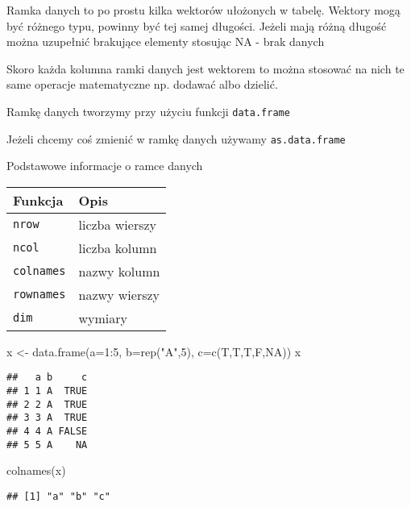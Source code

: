\documentclass[
]{book}
\newenvironment{Shaded}{\begin{snugshade}}{\end{snugshade}}
\newcommand{\AttributeTok}[1]{\textcolor[rgb]{0.77,0.63,0.00}{#1}}
\newcommand{\ConstantTok}[1]{\textcolor[rgb]{0.00,0.00,0.00}{#1}}
\newcommand{\DecValTok}[1]{\textcolor[rgb]{0.00,0.00,0.81}{#1}}
\newcommand{\FunctionTok}[1]{\textcolor[rgb]{0.00,0.00,0.00}{#1}}
\newcommand{\NormalTok}[1]{#1}
\newcommand{\OtherTok}[1]{\textcolor[rgb]{0.56,0.35,0.01}{#1}}
\newcommand{\SpecialCharTok}[1]{\textcolor[rgb]{0.00,0.00,0.00}{#1}}
\newcommand{\StringTok}[1]{\textcolor[rgb]{0.31,0.60,0.02}{#1}}
\begin{document}
Ramka danych to po prostu kilka wektorów ułożonych w tabelę. Wektory mogą być różnego typu, powinny być tej samej długości. Jeżeli mają różną długość można uzupełnić brakujące elementy stosując NA - brak danych

Skoro każda kolumna ramki danych jest wektorem to można stosować na nich te same operacje matematyczne np. dodawać albo dzielić.

Ramkę danych tworzymy przy użyciu funkcji \texttt{data.frame}

Jeżeli chcemy coś zmienić w ramkę danych używamy \texttt{as.data.frame}

Podstawowe informacje o ramce danych

\begin{longtable}[]{@{}ll@{}}
\toprule
Funkcja & Opis \\
\midrule
\endhead
\texttt{nrow} & liczba wierszy \\
\texttt{ncol} & liczba kolumn \\
\texttt{colnames} & nazwy kolumn \\
\texttt{rownames} & nazwy wierszy \\
\texttt{dim} & wymiary \\
\bottomrule
\end{longtable}

\begin{Shaded}
\begin{Highlighting}[]
\NormalTok{x }\OtherTok{\textless{}{-}} \FunctionTok{data.frame}\NormalTok{(}\AttributeTok{a=}\DecValTok{1}\SpecialCharTok{:}\DecValTok{5}\NormalTok{, }\AttributeTok{b=}\FunctionTok{rep}\NormalTok{(}\StringTok{"A"}\NormalTok{,}\DecValTok{5}\NormalTok{), }\AttributeTok{c=}\FunctionTok{c}\NormalTok{(T,T,T,F,}\ConstantTok{NA}\NormalTok{))}
\NormalTok{x}
\end{Highlighting}
\end{Shaded}

\begin{verbatim}
##   a b     c
## 1 1 A  TRUE
## 2 2 A  TRUE
## 3 3 A  TRUE
## 4 4 A FALSE
## 5 5 A    NA
\end{verbatim}

\begin{Shaded}
\begin{Highlighting}[]
\FunctionTok{colnames}\NormalTok{(x)}
\end{Highlighting}
\end{Shaded}

\begin{verbatim}
## [1] "a" "b" "c"
\end{verbatim}
\end{document}
